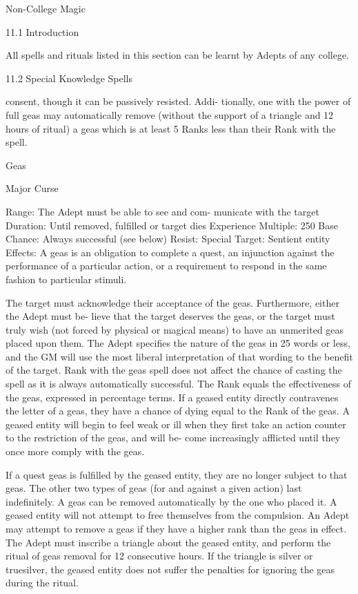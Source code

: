 \begin{Chapter}{Non-College Magic}

11.1 Introduction 

All spells and rituals listed in this section can be learnt by Adepts
of any college.

11.2 Special Knowledge Spells 

consent, though it can be passively resisted. Addi-
tionally,  one  with  the  power  of  full  geas  may 
automatically  remove  (without  the  support  of  a 
triangle  and  12  hours  of  ritual)  a  geas  which  is  at 
least 5 Ranks less than their Rank with the spell. 

Geas 

Major Curse 

Range:  The  Adept  must  be  able  to  see  and  com-
municate with the target 
Duration: Until removed, fulfilled or target dies 
Experience Multiple: 250 
Base Chance: Always successful (see below) 
Resist: Special 
Target: Sentient entity 
Effects:  A  geas  is  an  obligation  to  complete  a 
quest,  an  injunction  against  the  performance  of  a 
particular action, or a requirement to respond in the 
same fashion to particular stimuli. 

The  target  must  acknowledge  their  acceptance  of 
the  geas.  Furthermore,  either  the  Adept  must  be-
lieve that the target deserves the geas, or the target 
must truly wish (not forced by physical or magical 
means)  to  have  an  unmerited  geas  placed  upon 
them. The Adept specifies the nature of the geas in 
25  words  or  less,  and  the  GM  will  use  the  most 
liberal interpretation of that wording to the benefit 
of  the  target.  Rank  with  the  geas  spell  does  not 
affect the chance of casting the spell as it is always 
automatically  successful.  The  Rank  equals  the 
effectiveness  of  the  geas,  expressed  in  percentage 
terms.  If  a  geased  entity  directly  contravenes  the 
letter of a geas, they have a chance of dying equal 
to the Rank of the geas. A geased entity will begin 
to  feel  weak  or  ill  when  they  first  take  an  action 
counter  to  the  restriction  of  the  geas,  and  will  be-
come  increasingly  afflicted  until  they  once  more 
comply with the geas. 

If a quest geas is fulfilled by the geased entity, they 
are  no  longer  subject  to  that  geas.  The  other  two 
types  of  geas  (for  and  against  a  given  action)  last 
indefinitely.  A  geas  can be  removed  automatically 
by the one  who placed it. A geased entity will not 
attempt  to  free  themselves  from  the  compulsion. 
An  Adept  may  attempt  to  remove  a  geas  if  they 
have  a  higher  rank  than  the  geas  in  effect.  The 
Adept  must  inscribe  a  triangle  about  the  geased 
entity,  and  perform  the  ritual  of  geas  removal  for 
12  consecutive  hours.  If  the  triangle  is  silver  or 
truesilver,  the  geased  entity  does  not  suffer  the 
penalties for ignoring the geas during the ritual. 


\end{Chapter}
